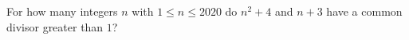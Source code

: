 For how many integers $n$ with $1\le n\le2020$ do $n^2+4$ and $n+3$ have a common divisor greater than $1$?
